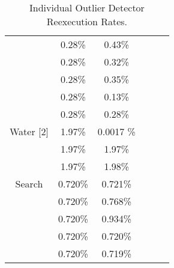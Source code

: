 \documentclass[11pt]{article}
\begin{document}
\begin{table}[thbp]
\begin{tabular}{c|ccccc|}
                  & 0.28\% & 0.43\% \\ 
                  & 0.28\% & 0.32\% \\ 
                  & 0.28\% & 0.35\% \\ 
                  & 0.28\% & 0.13\% \\ 
                  & 0.28\% & 0.28\% \\ 
	Water [2] & 1.97\% & 0.0017 \%  \\
              & 1.97\% & 1.97\% \\
              & 1.97\% & 1.98\%  \\
   Search & 0.720\% & 0.721\% \\
   		  & 0.720\% & 0.768\% \\
   		  & 0.720\% & 0.934\% \\
   		  & 0.720\% & 0.720\% \\
   		  & 0.720\% & 0.719\% \\
	
\end{tabular}
\caption {Individual Outlier Detector Reexecution Rates.}
\label{tbl:individualoutlierquality}
\end{table}
\end{document}

